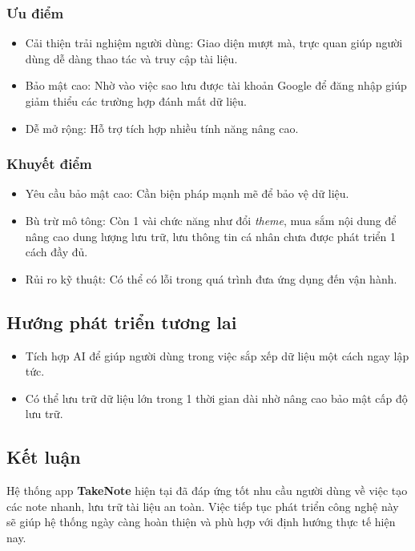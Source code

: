 \documentclass[a4paper,12pt]{article}
\begin{document}
\subsubsection{Ưu điểm}
\begin{itemize}
    \item Cải thiện trải nghiệm người dùng: Giao diện mượt mà, trực quan giúp người dùng dễ dàng thao tác và truy cập tài liệu.
    \item Bảo mật cao: Nhờ vào việc sao lưu được tài khoản Google để đăng nhập giúp giảm thiểu các trường hợp đánh mất dữ liệu.
    \item Dễ mở rộng: Hỗ trợ tích hợp nhiều tính năng nâng cao.
\end{itemize}

\subsubsection{Khuyết điểm}
\begin{itemize}
    \item Yêu cầu bảo mật cao: Cần biện pháp mạnh mẽ để bảo vệ dữ liệu.
    \item Bù trừ mô tông: Còn 1 vài chức năng như đổi \textit{theme}, mua sắm nội dung để nâng cao dung lượng lưu trữ, lưu thông tin cá nhân chưa được phát triển 1 cách đầy đủ.
    \item Rủi ro kỹ thuật: Có thể có lỗi trong quá trình đưa ứng dụng đến vận hành.
\end{itemize}

\subsection{Hướng phát triển tương lai}
\begin{itemize}
    \item Tích hợp AI để giúp người dùng trong việc sắp xếp dữ liệu một cách ngay lập tức.
    \item Có thể lưu trữ dữ liệu lớn trong 1 thời gian dài nhờ nâng cao bảo mật cấp độ lưu trữ.
\end{itemize}

\subsection{Kết luận}
Hệ thống app \textbf{TakeNote} hiện tại đã đáp ứng tốt nhu cầu người dùng về việc tạo các note nhanh, lưu trữ tài liệu an toàn. Việc tiếp tục phát triển công nghệ này sẽ giúp hệ thống ngày càng hoàn thiện và phù hợp với định hướng thực tế hiện nay.
\end{document}

